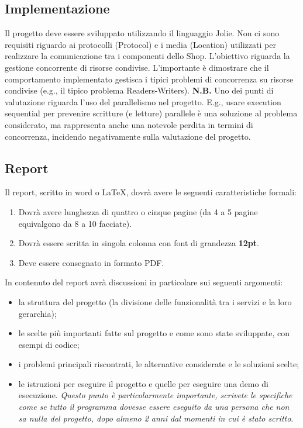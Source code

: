 \documentclass{article}
\begin{document}
\subsection{Implementazione}
%
Il progetto deve essere sviluppato utilizzando il linguaggio Jolie.
Non ci sono requisiti riguardo ai protocolli (Protocol) e i media (Location) utilizzati per realizzare la comunicazione tra i componenti dello Shop. 
L'obiettivo riguarda la gestione concorrente di risorse condivise. 
L'importante è dimostrare che il comportamento implementato gestisca i tipici problemi di concorrenza su risorse condivise (e.g., il tipico problema Readers-Writers).
%
\newline\newline
%
\textbf{N.B.} Uno dei punti di valutazione riguarda l'uso del parallelismo nel progetto. 
E.g., usare execution { sequential } per prevenire scritture (e letture) parallele è una soluzione al problema considerato, ma rappresenta anche una notevole perdita in termini di concorrenza, incidendo negativamente sulla valutazione del progetto.
%
\subsection{Report}
%
Il report, scritto in word o \LaTeX, dovrà avere le seguenti caratteristiche formali:
\begin{enumerate}
    \item Dovrà avere lunghezza di quattro o cinque pagine (da 4 a 5 pagine equivalgono da 8 a 10 facciate).
    \item Dovrà essere scritta in singola colonna con font di grandezza \textbf{12pt}.
    \item Deve essere consegnato in formato PDF.
\end{enumerate}
In contenuto del report avrà discussioni in particolare sui seguenti argomenti:
\begin{itemize}
    \item la struttura del progetto (la divisione delle funzionalità tra i servizi e la loro gerarchia);
    \item le scelte più importanti fatte sul progetto e come sono state sviluppate, con esempi di codice;
    \item i problemi principali riscontrati, le alternative considerate e le soluzioni scelte;
    \item le istruzioni per eseguire il progetto e quelle per eseguire una demo di esecuzione. \textit{Questo punto è particolarmente importante, scrivete le specifiche come se tutto il programma dovesse essere eseguito da una persona che non sa nulla del progetto, dopo almeno 2 anni dal momenti in cui è stato scritto}.
\end{itemize}
\end{document}
